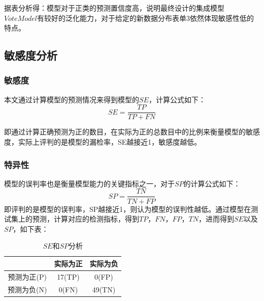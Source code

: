 \documentclass[UTF8]{ctexart}
\begin{document}
据表分析得：模型对于正类的预测置信度高，说明最终设计的集成模型$VoteModel有$较好的泛化能力，对于给定的新数据分布表单3依然体现敏感性低的特点。

\subsection{敏感度分析}
\subsubsection{敏感度}
本文通过计算模型的预测情况来得到模型的$SE$，计算公式如下：
\begin{equation}
    SE=\frac{TP}{TP+FN}
\end{equation}

即通过计算正确预测为正的数目，在实际为正的总数目中的比例来衡量模型的敏感度，实际上评判的是模型的漏检率，SE越接近1，敏感度越低。

\subsubsection{特异性}
模型的误判率也是衡量模型能力的关键指标之一，对于$SP$的计算公式如下：
\begin{equation}
    SP=\frac{TN}{TN+FP}
\end{equation}
即评判的是模型的误判率，SP越接近1，则认为模型的误判性越低。通过模型在测试集上的预测，计算对应的检测指标，得到$TP$，$FN$，$FP$，$TN$，进而得到$SE$以及$SP$，如下表：

\begin{table}[H]
    \caption{$SE$和$SP$分析}
    \begin{tabular}{|c|c|c|}
        \hline
                    & 实际为正 & 实际为负 \\ \hline
        预测为正(P) & 17(TP)   & 0(FP)    \\ \hline
        预测为负(N) & 0(FN)    & 49(TN)   \\ \hline
    \end{tabular}
\end{table}
\end{document}
